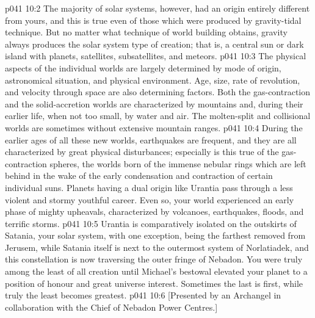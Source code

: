 \vs p041 10:2 The majority of solar systems, however, had an origin entirely different from yours, and this is true even of those which were produced by gravity\hyp{}tidal technique. But no matter what technique of world building obtains, gravity always produces the solar system type of creation; that is, a central sun or dark island with planets, satellites, subsatellites, and meteors.
\vs p041 10:3 \pc The physical aspects of the individual worlds are largely determined by mode of origin, astronomical situation, and physical environment. Age, size, rate of revolution, and velocity through space are also determining factors. Both the gas\hyp{}contraction and the solid\hyp{}accretion worlds are characterized by mountains and, during their earlier life, when not too small, by water and air. The molten\hyp{}split and collisional worlds are sometimes without extensive mountain ranges.
\vs p041 10:4 During the earlier ages of all these new worlds, earthquakes are frequent, and they are all characterized by great physical disturbances; especially is this true of the gas\hyp{}contraction spheres, the worlds born of the immense nebular rings which are left behind in the wake of the early condensation and contraction of certain individual suns. Planets having a dual origin like Urantia pass through a less violent and stormy youthful career. Even so, your world experienced an early phase of mighty upheavals, characterized by volcanoes, earthquakes, floods, and terrific storms.
\vs p041 10:5 \pc Urantia is comparatively isolated on the outskirts of Satania, your solar system, with one exception, being the farthest removed from Jerusem, while Satania itself is next to the outermost system of Norlatiadek, and this constellation is now traversing the outer fringe of Nebadon. You were truly among the least of all creation until Michael’s bestowal elevated your planet to a position of honour and great universe interest. Sometimes the last is first, while truly the least becomes greatest.
\vsetoff
\vs p041 10:6 [Presented by an Archangel in collaboration with the Chief of Nebadon Power Centres.]
